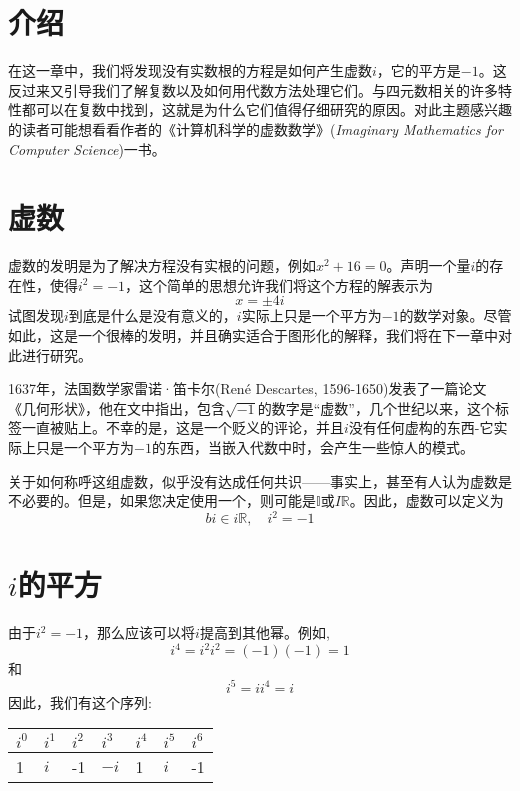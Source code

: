 
\section{介绍}
在这一章中，我们将发现没有实数根的方程是如何产生虚数$i$，它的平方是$-1$。这反过来又引导我们了解复数以及如何用代数方法处理它们。与四元数相关的许多特性都可以在复数中找到，这就是为什么它们值得仔细研究的原因。对此主题感兴趣的读者可能想看看作者的《计算机科学的虚数数学》(\textit{Imaginary Mathematics for Computer Science})一书\cite{bib3-1}。

\section{虚数}
虚数的发明是为了解决方程没有实根的问题，例如$x^{2}+16=0$。声明一个量$i$的存在性，使得$i^{2}=-1$，这个简单的思想允许我们将这个方程的解表示为
$$
  x= \pm 4 i
$$
试图发现$i$到底是什么是没有意义的，$i$实际上只是一个平方为$-1$的数学对象。尽管如此，这是一个很棒的发明，并且确实适合于图形化的解释，我们将在下一章中对此进行研究。

1637年，法国数学家雷诺·笛卡尔(René Descartes, 1596-1650)发表了一篇论文《几何形状》\cite{bib3-2}，他在文中指出，包含$\sqrt{-1}$的数字是“虚数”，几个世纪以来，这个标签一直被贴上。不幸的是，这是一个贬义的评论，并且$i$没有任何虚构的东西-它实际上只是一个平方为$-1$的东西，当嵌入代数中时，会产生一些惊人的模式。

关于如何称呼这组虚数，似乎没有达成任何共识——事实上，甚至有人认为虚数是不必要的。但是，如果您决定使用一个，则可能是$\mathbb{I}$或$ I \mathbb{R}$。因此，虚数可以定义为
$$
  b i \in i \mathbb{R}, \quad i^{2}=-1
$$

\section{\boldmath$i$的平方}

由于$i^{2}=-1$，那么应该可以将$i$提高到其他幂。例如,
$$
  i^{4}=i^{2} i^{2}=(-1)(-1)=1
$$
和
$$
  i^{5}=i i^{4}=i
$$
因此，我们有这个序列:
\begin{center}
  \begin{tabular}{lllllll}
    \hline
    $i^{0}$ & $i^{1}$ & $i^{2}$ & $i^{3}$ & $i^{4}$ & $i^{5}$ & $i^{6}$ \\
    \hline
    1       & $i$     & -1      & $-i$    & 1       & $i$     & -1      \\
    \hline
  \end{tabular}
\end{center}

